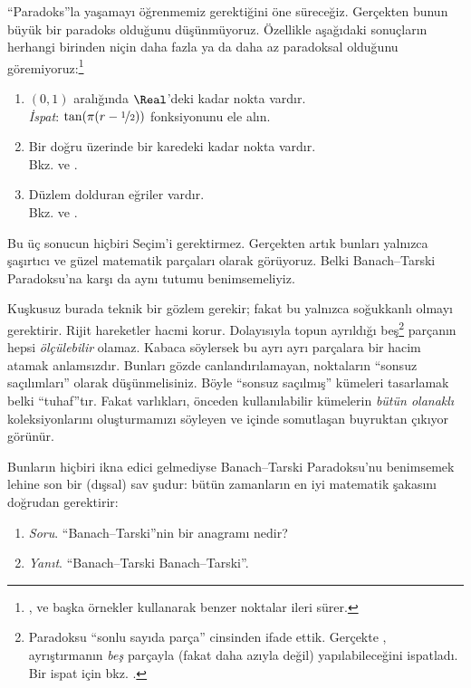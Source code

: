 ``Paradoks''la yaşamayı öğrenmemiz gerektiğini öne süreceğiz. Gerçekten
bunun büyük bir paradoks olduğunu düşünmüyoruz. Özellikle aşağıdaki
sonuçların herhangi birinden niçin daha fazla ya da daha az paradoksal
olduğunu göremiyoruz:\footnote{\citet[276--7]{Potter2004},
\citet[16]{Weston2003} ve \citet[31, 308--9]{Wagon2016} başka örnekler
kullanarak benzer noktalar ileri sürer.}
\begin{enumerate}
	\item $(0,1)$ aralığında $\Real$'deki kadar nokta vardır.
	\\\emph{İspat}: $\tan(\pi(r-\nicefrac{1}{2}))$ fonksiyonunu ele alın.
	\item Bir doğru üzerinde bir karedeki kadar nokta vardır.
	\\Bkz.  ve
	.
	\item Düzlem dolduran eğriler vardır.
	\\Bkz.  ve
	.
\end{enumerate}
Bu üç sonucun hiçbiri Seçim'i gerektirmez. Gerçekten artık bunları yalnızca
şaşırtıcı ve güzel matematik parçaları olarak görüyoruz. Belki
Banach--Tarski Paradoksu'na karşı da aynı tutumu benimsemeliyiz.

Kuşkusuz burada teknik bir gözlem gerekir; fakat bu yalnızca soğukkanlı
olmayı gerektirir. Rijit hareketler hacmi korur. Dolayısıyla topun ayrıldığı
beş\footnote{Paradoksu ``sonlu sayıda parça'' cinsinden ifade ettik.
Gerçekte \citet{Robinson1947}, ayrıştırmanın \emph{beş} parçayla (fakat
daha azıyla değil) yapılabileceğini ispatladı. Bir ispat için bkz.
\citet[pp.~66--7]{Wagon2016}.} parçanın hepsi \emph{ölçülebilir} olamaz.
Kabaca söylersek bu ayrı ayrı parçalara bir hacim atamak anlamsızdır.
Bunları gözde canlandırılamayan, noktaların ``sonsuz saçılımları'' olarak
düşünmelisiniz. Böyle ``sonsuz saçılmış'' kümeleri tasarlamak belki
``tuhaf''tır. Fakat varlıkları, önceden kullanılabilir kümelerin
\emph{bütün olanaklı} koleksiyonlarını oluşturmamızı söyleyen ve
\stagesacc{} içinde somutlaşan buyruktan çıkıyor görünür.

Bunların hiçbiri ikna edici gelmediyse Banach--Tarski Paradoksu'nu
benimsemek lehine son bir (dışsal) sav şudur: bütün zamanların en iyi
matematik şakasını doğrudan gerektirir:
\begin{enumerate}
	\item[] \emph{Soru}. ``Banach--Tarski''nin bir anagramı nedir?
	\item[] \emph{Yanıt}. ``Banach--Tarski Banach--Tarski''.
\end{enumerate}

